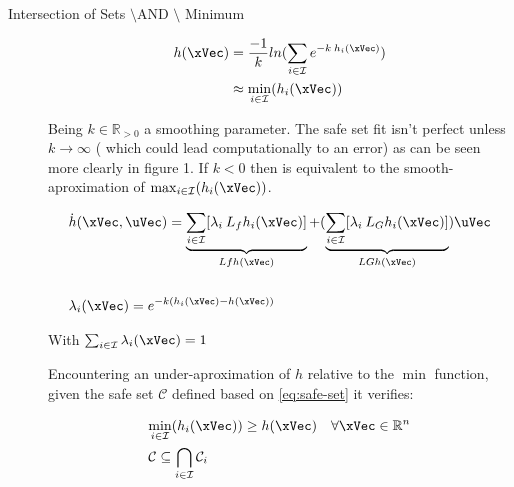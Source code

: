 \begin{description}

    \item[Intersection of Sets \(\setminus\)AND \(\setminus\) Minimum]

    \begin{align}
        h(\xVec) &= \frac{-1}{k}ln(\sum_{i \in \mathcal{I}} e^{-k \hspace{0.2em} h_i(\xVec)}) 
        \label{eq:Min_smoothFunc} \\
                 &\approx \underset{i \in \mathcal{I}}{\min} (h_i(\xVec))
        \notag  
    \end{align}

    Being  \(k \in \mathbb{R}_{>0}\) a smoothing parameter. The safe set fit isn't perfect unless \(k \to \infty\) ( which could lead computationally to an error) as can be seen more clearly in \cite{molnar2023composing} figure 1. If \(k<0\) then is equivalent to the smooth-aproximation of \(\max_{i \in \mathcal{I}}(h_i(\xVec))\). 

    \begin{subequations}
        \begin{align}
            &\dot{h}(\xVec , \uVec) = \underbrace{\sum_{i \in \mathcal{I}} [\lambda_i \hspace{0.2em} L_fh_i(\xVec)]}_{Lfh(\xVec)} + (\underbrace{\sum_{i \in \mathcal{I}} [\lambda_i \hspace{0.2em} L_Gh_i(\xVec)]}_{LGh(\xVec)})\uVec 
            \label{eq:Min_smooth_derivative} \\ \notag \\
            &\lambda_i(\xVec) = e^{-k(h_i(\xVec)-h(\xVec))}
            \label{eq:Min_lambda_smoothFunc}
        \end{align}
    \end{subequations}

    With \(\sum_{i \in \mathcal{I}} \lambda_i(\xVec) = 1\) \par
    Encountering an under-aproximation of \(h\) relative to the \(\min\) function, given the safe set \(\mathcal{C}\) defined based on \eqref{eq:safe-set} it verifies:

    \begin{subequations}
        \begin{align}
            &\underset{i \in \mathcal{I}}{\min} (h_i(\xVec)) \geq h(\xVec) \quad \forall \xVec \in \mathbb{R}^n 
            \label{eq:Intersection_CBF_Comparation} \\
            &\mathcal{C} \subseteq \bigcap_{i \in \mathcal{I}} \mathcal{C}_i
            \label{eq:Intersection_SafeSet_Comparation}
        \end{align}
    \end{subequations}


\end{description}
